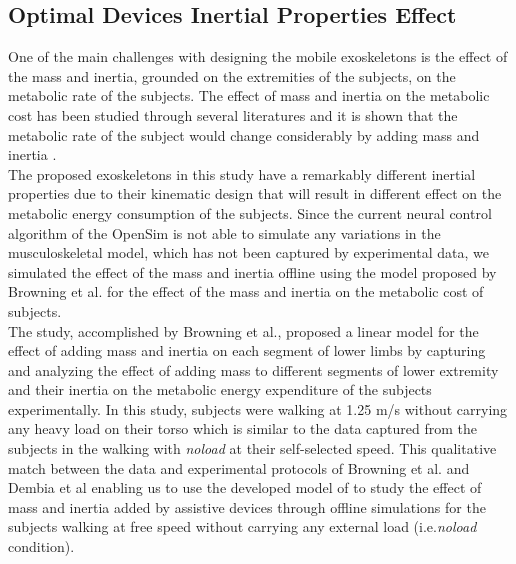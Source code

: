 \documentclass[10pt,letterpaper]{article}
\begin{document}
\subsection*{Optimal Devices Inertial Properties Effect}
One of the main challenges with designing the mobile exoskeletons is the effect of the mass and inertia, grounded on the extremities of the subjects, on the metabolic rate of the subjects. The effect of mass and inertia on the metabolic cost has been studied through several literatures \cite{133,134} and it is shown that the metabolic rate of the subject would change considerably by adding mass and inertia \cite{133,134,135}.\\
The proposed exoskeletons in this study have a remarkably different inertial properties due to their kinematic design that will result in different effect on the metabolic energy consumption of the subjects. Since the current neural control algorithm of the OpenSim is not able to simulate any variations in the musculoskeletal model\cite{92}, which has not been captured by experimental data, we simulated the effect of the mass and inertia offline using the model proposed by Browning et al.\cite{133} for the effect of the mass and inertia on the metabolic cost of subjects.\\
The study, accomplished by Browning et al.\cite{133}, proposed a linear model for the effect of adding mass and inertia on each segment of lower limbs by capturing and analyzing the effect of adding mass to different segments of lower extremity and their inertia on the metabolic energy expenditure of the subjects experimentally. In this study, subjects were walking at 1.25 m/s without carrying any heavy load on their torso which is similar to the data captured from the subjects in the walking with \textit{\textit{noload}} at their self-selected speed\cite{93}. This qualitative match between the data and experimental protocols of Browning et al. and Dembia et al enabling us to use the developed model of \cite{133}  to study the effect of mass and inertia added by assistive devices through offline simulations for the subjects walking at free speed without carrying any external load (i.e.{\it noload} condition).\\
\end{document}
